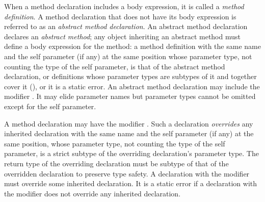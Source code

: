 When a method declaration includes a body expression, it is called a
\emph{method definition}.
A method declaration that does not have its body expression is referred to
as an \emph{abstract method declaration}.
An abstract method declaration declares an \emph{abstract method};
any object inheriting an abstract method must define a body expression for the
method: a method definition with the same name and the self parameter (if any)
at the same position whose parameter type, not counting the type of the self
parameter, is that of the abstract method declaration, or definitions whose
parameter types are subtypes of it and together cover it
(), or it is a static error.
An abstract method declaration may include the modifier .
It may elide parameter names but parameter
types cannot be omitted except for the self parameter.



A method declaration may have the modifier .
Such a declaration \emph{overrides} any inherited declaration with the same name
and the self parameter (if any) at the same position,
whose parameter type, not counting the type of the self parameter,
is a strict subtype of the overriding declaration's parameter type.
The return type of the overriding declaration must be subtype of
that of the overridden declaration to preserve type safety.
A declaration with the modifier  must override
some inherited declaration.
It is a static error if a declaration with the modifier 
does not override any inherited declaration.

